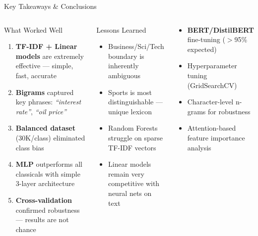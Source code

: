 \documentclass[aspectratio=169,11pt]{beamer}
\begin{document}
\begin{frame}{Key Takeaways \& Conclusions}
  \vspace{-0.5cm}
\begin{columns}[T]
    \begin{block}{What Worked Well}
      \small
      \begin{enumerate}
        \item \textbf{TF-IDF + Linear models} are extremely effective --- simple, fast, accurate
        \item \textbf{Bigrams} captured key phrases: \textit{``interest rate''}, \textit{``oil price''}
        \item \textbf{Balanced dataset} (30K/class) eliminated class bias
        \item \textbf{MLP} outperforms all classicals with simple 3-layer architecture
        \item \textbf{Cross-validation} confirmed robustness --- results are not chance
      \end{enumerate}
    \end{block}
    \begin{block}{Lessons Learned}
      \tiny
      \begin{itemize}
        \item Business/Sci/Tech boundary is inherently ambiguous
        \item Sports is most distinguishable --- unique lexicon
        \item Random Forests struggle on sparse TF-IDF vectors
        \item Linear models remain very competitive with neural nets on text
      \end{itemize}
    \end{block}
    \vspace{-0.1cm}
    \begin{tcolorbox}[colback=accent!8,colframe=accent,title=Future Directions,fonttitle=\footnotesize\bfseries]
      \footnotesize
      \begin{itemize}
        \item \textbf{BERT/DistilBERT} fine-tuning ($>$95\% expected)
        \item Hyperparameter tuning (GridSearchCV)
        \item Character-level n-grams for robustness
        \item Attention-based feature importance analysis
      \end{itemize}
    \end{tcolorbox}
\end{columns}
\end{frame}
\end{document}
